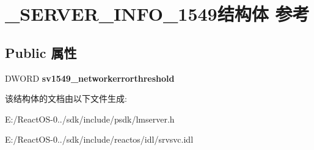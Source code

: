 \hypertarget{struct___s_e_r_v_e_r___i_n_f_o__1549}{}\section{\+\_\+\+S\+E\+R\+V\+E\+R\+\_\+\+I\+N\+F\+O\+\_\+1549结构体 参考}
\label{struct___s_e_r_v_e_r___i_n_f_o__1549}
\subsection*{Public 属性}
\begin{DoxyCompactItemize}
\item 
\mbox{\label{struct___s_e_r_v_e_r___i_n_f_o__1549_a4117783991a16775d5f1b716dc8c8a15}} 
D\+W\+O\+RD {\bfseries sv1549\+\_\+networkerrorthreshold}
\end{DoxyCompactItemize}


该结构体的文档由以下文件生成\+:\begin{DoxyCompactItemize}
\item 
E\+:/\+React\+O\+S-\/0../sdk/include/psdk/lmserver.\+h\item 
E\+:/\+React\+O\+S-\/0../sdk/include/reactos/idl/srvsvc.\+idl\end{DoxyCompactItemize}
